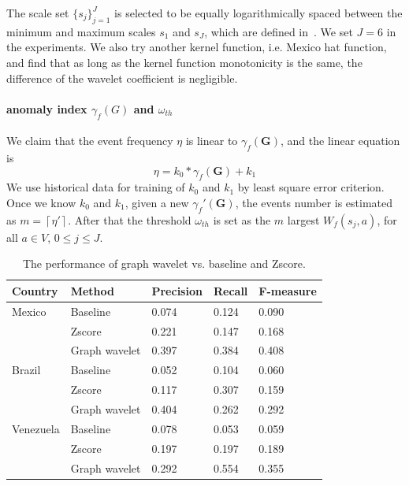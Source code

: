 The scale set $\{s_j\}_{j=1}^J$ is selected to be equally logarithmically spaced between the minimum and maximum scales $s_1$ and $s_J$, which are defined in~\cite{hammond2011wavelets}. We set $J=6$ in the experiments. We also try another kernel function, i.e. Mexico hat function, and find that as long as the kernel function monotonicity is the same, the difference of the wavelet coefficient is negligible.


\paragraph{anomaly index $\gamma_f(G)$ and $\omega_{th}$}
We claim that the event frequency $\eta$ is linear to $\gamma_f(\mathbf{G})$, and the linear equation is
\begin{equation}
\label{eq:linear_equation}
\eta = k_0*\gamma_f(\mathbf{G}) + k_1
\end{equation}We use historical data for training of $k_0$ and $k_1$ by least square error criterion. Once we know
$k_0$ and $k_1$, given a new $\gamma_f'(\mathbf{G})$, the events number is estimated as $m=\left \lceil \eta' \right \rceil$. After that the threshold $\omega_{th}$ is set as the $m$ largest $W_f(s_j,a)$, for all $a\in V$, $0\le j \le J$.




\begin{table}[bth] %
\renewcommand{\arraystretch}{1.1}
\caption{\label{table:models_compare} The performance of graph wavelet vs. baseline and Zscore.}
\scriptsize
\centering
\begin{tabular}{ l | l |l | l | l}
\hline
\textbf{Country} & \textbf{Method}& \textbf{Precision}  & \textbf{Recall}  & \textbf{F-measure} \\
\hline
Mexico & Baseline & 0.074 &0.124 & 0.090 \\
       & Zscore & 0.221 &0.147 & 0.168 \\
 & Graph wavelet& 0.397 &0.384 & 0.408 \\
\hline
Brazil & Baseline & 0.052 &0.104 & 0.060\\
       & Zscore & 0.117&0.307 & 0.159 \\
 & Graph wavelet& 0.404 &0.262 & 0.292 \\
\hline
Venezuela & Baseline & 0.078 &0.053 & 0.059 \\
       & Zscore & 0.197 &0.197 & 0.189 \\
 & Graph wavelet& 0.292 &0.554 & 0.355 \\
\hline
\end{tabular}
\end{table}



